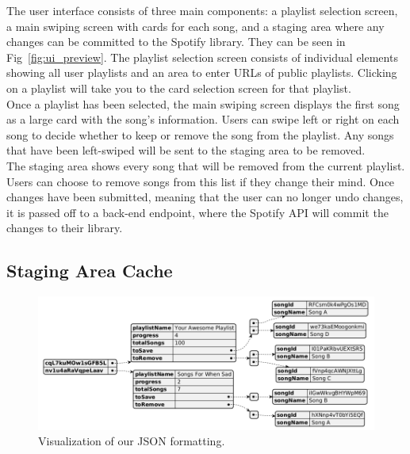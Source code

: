 \documentclass{article}
\begin{document}
\quad The user interface consists of three main components: a playlist selection screen, a main swiping screen with cards for each song, and a staging area where any changes can be committed to the Spotify library. They can be seen in Fig~\ref{fig:ui_preview}. The playlist selection screen consists of individual elements showing all user playlists and an area to enter URLs of public playlists. Clicking on a playlist will take you to the card selection screen for that playlist. \\

\quad Once a playlist has been selected, the main swiping screen displays the first song as a large card with the song's information. Users can swipe left or right on each song to decide whether to keep or remove the song from the playlist. Any songs that have been left-swiped will be sent to the staging area to be removed. \\

\quad The staging area shows every song that will be removed from the current playlist.  Users can choose to remove songs from this list if they change their mind.  Once changes have been submitted, meaning that the user can no longer undo changes, it is passed off to a back-end endpoint, where the Spotify API will commit the changes to their library. \\

\subsection{Staging Area Cache}

\begin{figure}[ht]
  \centering
  \includegraphics[width=6in]{./json2.png}
  \caption{Visualization of our JSON formatting.}
  \label{fig:jsondiagram}
\end{figure}
\end{document}
